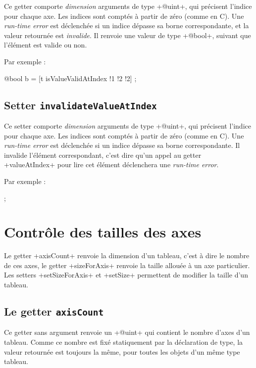 Ce getter comporte \emph{dimension} arguments de type \ggs+@uint+, qui précisent l'indice pour chaque axe. Les indices sont comptés à partir de zéro (comme en C). Une \emph{run-time error} est déclenchée si un indice dépasse sa borne correspondante, et la valeur retournée est \emph{invalide}. Il renvoie une valeur de type \ggs+@bool+, suivant que l'élément est valide ou non.

Par exemple :
\begin{galgas}
  @bool b = [t isValueValidAtIndex !1 !2 !2] ;
\end{galgas}


\subsection{Setter \texttt{invalidateValueAtIndex}}

Ce setter comporte \emph{dimension} arguments de type \ggs+@uint+, qui précisent l'indice pour chaque axe. Les indices sont comptés à partir de zéro (comme en C). Une \emph{run-time error} est déclenchée si un indice dépasse sa borne correspondante. Il invalide l'élément correspondant, c'est dire qu'un appel au getter \ggs+valueAtIndex+ pour lire cet élément déclenchera une \emph{run-time error}.

Par exemple :
\begin{galgas}
  [!?t invalidateValueAtIndex !1 !2 !2] ;
\end{galgas}





\section{Contrôle des tailles des axes}

Le getter \ggs+axisCount+ renvoie la dimension d'un tableau, c'est à dire le nombre de ces axes, le getter \ggs+sizeForAxis+ renvoie la taille allouée à un axe particulier. Les setters \ggs+setSizeForAxis+ et \ggs+setSize+ permettent de modifier la taille d'un tableau.



\subsection{Le getter \texttt{axisCount}}

Ce getter sans argument renvoie un \ggs+@uint+ qui contient le nombre d'axes d'un tableau. Comme ce nombre est fixé statiquement par la déclaration de type, la valeur retournée est toujours la même, pour toutes les objets d'un même type tableau.


